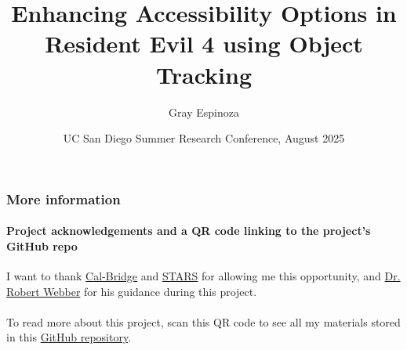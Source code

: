 \documentclass[aspectratio=43]{beamer}
\title[Enhancing Accessibility in Resident Evil 4]{Enhancing
Accessibility Options in Resident Evil 4 using Object Tracking}
\author{Gray Espinoza}
\institute{California State University,\\Fullerton}
\date[13 August 2025]{UC San Diego Summer Research Conference, August 2025}
\begin{document}
\begin{frame}[plain]
  \titlepage
\end{frame}

\begin{frame}
  \frametitle{More information}
  \framesubtitle{Project acknowledgements and a QR code linking to
  the project's GitHub repo}

  I want to thank \href{https://calbridge.org}{Cal-Bridge} and
  \href{https://grad.ucsd.edu/oar2/oar2office/programs/undergraduate-programs/stars}{STARS}
  for allowing me this opportunity, and
  \href{https://sites.google.com/ucsd.edu/rwebber}{Dr. Robert Webber}
  for his guidance during this project.
  \\~\\

  To read more about this project, scan this QR code to see all my
  materials stored in this
  \href{https://github.com/grayespinoza/cbsp25}{GitHub repository}.
  \\~\\

  \begin{center}
  \end{center}
\end{frame}
\end{document}
